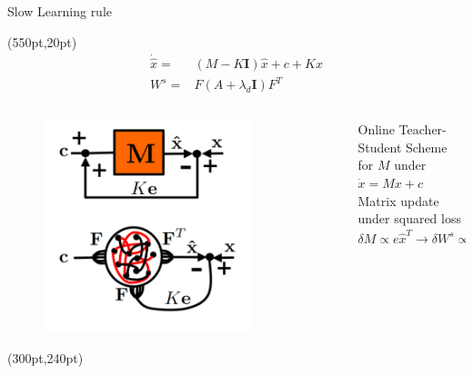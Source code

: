 \documentclass[17pt, t, lualatex]{beamer}
\begin{document}

\begin{frame}{Slow Learning rule}


	\begin{textblock*}{10pt}(550pt,20pt)
		\small
		\begin{equation*}
		\begin{aligned}
			\dot{\hat{x}}=&(M-K \mathbf{I}) \hat{x}+c+K x\\
			W^s =& F\left(A + \lambda_d\mathbf{I}\right)F^T
		\end{aligned}
		\end{equation*}
	\end{textblock*}

	\begin{columns}
		\begin{column}{0.45\textwidth}
			\begin{figure}
				\centering
				\includegraphics[width = 0.8\textwidth,trim= 0cm 0cm 0cm 8cm]{figures/slow_learning_rule.png}
			\end{figure}
			\begin{textblock*}{10pt}(300pt,240pt)
				\small
				\cite{bourdoukan_enforcing_2015}
			\end{textblock*}
		\end{column}
		\begin{column}{0.45\textwidth}
			Online Teacher-Student Scheme for $M$ under $\dot{x} = Mx +c$\\
			Matrix update under squared loss
			\begin{equation}
				\delta M \propto e\hat{x}^T \longrightarrow\delta W^s \propto F^T \left(e\hat{x}^T\right)F \approx F^T er
			\end{equation}
		\end{column}
	\end{columns}
\end{frame}
\end{document}
